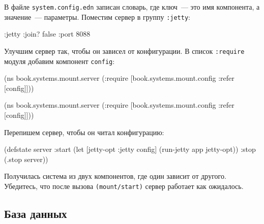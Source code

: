 \fi

В файле \verb|system.config.edn| записан словарь, где ключ~--- это имя компонента, а
значение~--- параметры. Поместим сервер в группу \verb|:jetty|:

\begin{english}
  \begin{clojure}
{:jetty {:join? false :port 8088}}
  \end{clojure}
\end{english}


Улучшим сервер так, чтобы он зависел от конфигурации. В список \verb|:require|
модуля добавим компонент \verb|config|:

\ifnarrow

\begin{english}
  \begin{clojure}
(ns book.systems.mount.server
 (:require
  [book.systems.mount.config
   :refer [config]]))
  \end{clojure}
\end{english}

\else

\begin{english}
  \begin{clojure}
(ns book.systems.mount.server
 (:require
  [book.systems.mount.config :refer [config]]))
  \end{clojure}
\end{english}

\fi

\noindent
Перепишем сервер, чтобы он читал конфигурацию:

\begin{english}
  \begin{clojure}
(defstate server
  :start
  (let [{jetty-opt :jetty} config]
    (run-jetty app jetty-opt))
  :stop
  (.stop server))
  \end{clojure}
\end{english}

Получилась система из двух компонентов, где один зависит от другого. Убедитесь,
что после вызова \verb|(mount/start)| сервер работает как ожидалось.

\subsection{База данных}


